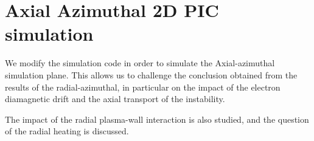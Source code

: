 



\chapter{Axial Azimuthal 2D PIC simulation}
\label{ch-6}


\begin{Chabstract}
  We modify the simulation code \LPPic in order to simulate the Axial-azimuthal simulation plane.
  This allows us to challenge the conclusion obtained from the results of the radial-azimuthal, in particular on the impact of the electron diamagnetic drift and the axial transport of the instability.
  
  The impact of the radial plasma-wall interaction is also studied, and the question of the radial heating is discussed. 
\end{Chabstract}
\renewcommand\subfigurewidth{3in}

% 
% 

\minitoc








